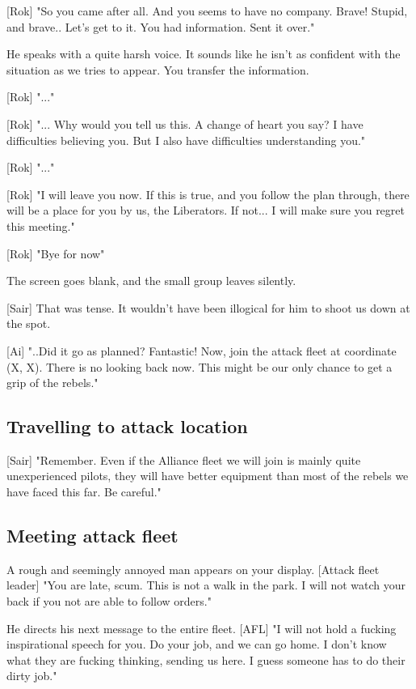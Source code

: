 \documentclass[a4paper,12pt]{article}
\begin{document}
[Rok] "So you came after all. And you seems to have no company. Brave!
Stupid, and brave.. Let's get to it. You had information. Sent it over."

He speaks with a quite harsh voice. It sounds like he isn't as confident with
the situation as we tries to appear. You transfer the information.

[Rok] "..."

[Rok] "... Why would you tell us this. A change of heart you say? I have
difficulties believing you. But I also have difficulties understanding you."

[Rok] "..."

[Rok] "I will leave you now. If this is true, and you follow the plan through,
there will be a place for you by us, the Liberators. If not... I will make
sure you regret this meeting."

[Rok] "Bye for now"

The screen goes blank, and the small group leaves silently.

[Sair] That was tense. It wouldn't have been illogical for him to shoot us
down at the spot.

[Ai] "..Did it go as planned? Fantastic! Now, join the attack fleet at coordinate
(X, X). There is no looking back now. This might be our only chance to get a
grip of the rebels."

\subsection{Travelling to attack location}

[Sair] "Remember. Even if the Alliance fleet we will join is mainly quite
unexperienced pilots, they will have better equipment than most of the rebels
we have faced this far. Be careful."

\subsection{Meeting attack fleet}

A rough and seemingly annoyed man appears on your display.
[Attack fleet leader] "You are late, scum. This is not a walk in the park.
I will not watch your back if you not are able to follow orders."

He directs his next message to the entire fleet.
[AFL] "I will not hold a fucking inspirational speech for you. Do your job,
and we can go home. I don't know what they are fucking thinking, sending us here.
I guess someone has to do their dirty job."
\end{document}
